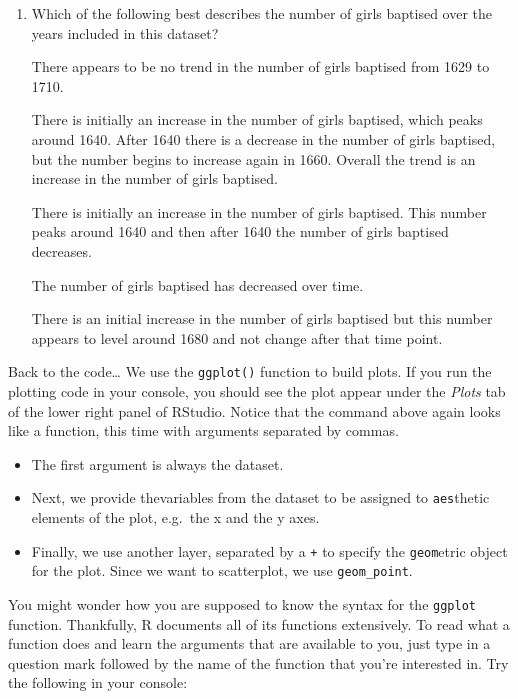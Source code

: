 \documentclass[
]{article}
\providecommand{\tightlist}{%
  \setlength{\itemsep}{0pt}\setlength{\parskip}{0pt}}
\begin{document}
\begin{enumerate}
\def\labelenumi{\arabic{enumi}.}
\tightlist
\item
  Which of the following best describes the number of girls baptised
  over the years included in this dataset?

  There appears to be no trend in the number of girls baptised from 1629
  to 1710.

  There is initially an increase in the number of girls baptised, which
  peaks around 1640. After 1640 there is a decrease in the number of
  girls baptised, but the number begins to increase again in 1660.
  Overall the trend is an increase in the number of girls baptised.

  There is initially an increase in the number of girls baptised. This
  number peaks around 1640 and then after 1640 the number of girls
  baptised decreases.

  The number of girls baptised has decreased over time.

  There is an initial increase in the number of girls baptised but this
  number appears to level around 1680 and not change after that time
  point.
\end{enumerate}

Back to the code\ldots{} We use the \texttt{ggplot()} function to build
plots. If you run the plotting code in your console, you should see the
plot appear under the \emph{Plots} tab of the lower right panel of
RStudio. Notice that the command above again looks like a function, this
time with arguments separated by commas.

\begin{itemize}
\tightlist
\item
  The first argument is always the dataset.
\item
  Next, we provide thevariables from the dataset to be assigned to
  \texttt{aes}thetic elements of the plot, e.g.~the x and the y axes.
\item
  Finally, we use another layer, separated by a \texttt{+} to specify
  the \texttt{geom}etric object for the plot. Since we want to
  scatterplot, we use \texttt{geom\_point}.
\end{itemize}

You might wonder how you are supposed to know the syntax for the
\texttt{ggplot} function. Thankfully, R documents all of its functions
extensively. To read what a function does and learn the arguments that
are available to you, just type in a question mark followed by the name
of the function that you're interested in. Try the following in your
console:
\end{document}
